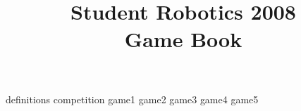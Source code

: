 \documentclass[a4paper, 12pt]{article}
\begin{document}
\title {Student Robotics 2008\\Game Book}

\maketitle

\tableofcontents
 {definitions}
 {competition}
 {game1}
 {game2}
 {game3}
 {game4}
 {game5}
\end{document}

